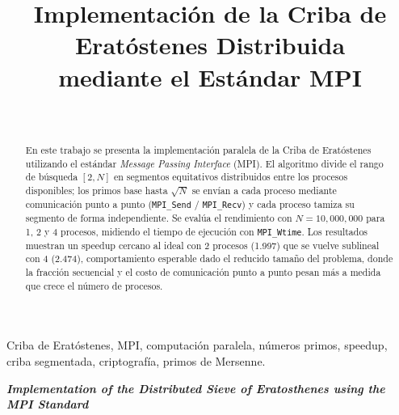 \documentclass[conference]{IEEEtran}
\begin{document}
\title{\LARGE Implementación de la Criba de Eratóstenes Distribuida\\
       mediante el Estándar MPI}

\author{%
  \\[4pt]
}

\maketitle

\renewcommand{\abstractname}{Resumen}
\begin{abstract}
En este trabajo se presenta la implementación paralela de la Criba de
Eratóstenes utilizando el estándar \textit{Message Passing Interface} (MPI).
El algoritmo divide el rango de búsqueda $[2, N]$ en segmentos equitativos
distribuidos entre los procesos disponibles; los primos base hasta
$\sqrt{N}$ se envían a cada proceso mediante comunicación punto a punto
(\texttt{MPI\_Send} / \texttt{MPI\_Recv}) y cada proceso tamiza
su segmento de forma independiente. Se evalúa el rendimiento con $N =
10{,}000{,}000$ para 1, 2 y 4 procesos, midiendo el tiempo de ejecución con
\texttt{MPI\_Wtime}. Los resultados muestran un speedup cercano al ideal con
2 procesos (1.997) que se vuelve sublineal con 4 (2.474), comportamiento
esperable dado el reducido tamaño del problema, donde la fracción secuencial y
el costo de comunicación punto a punto pesan más a medida que crece el número
de procesos.
\end{abstract}
\renewcommand{\IEEEkeywordsname}{Palabras clave}
\begin{IEEEkeywords}
Criba de Eratóstenes, MPI, computación paralela, números primos,
speedup, criba segmentada, criptografía, primos de Mersenne.
\end{IEEEkeywords}

\vfill

{\centering\normalsize\textbf{\textit{Implementation of the Distributed Sieve
of Eratosthenes using the MPI Standard}}\par}
\vspace{2pt}
\end{document}
